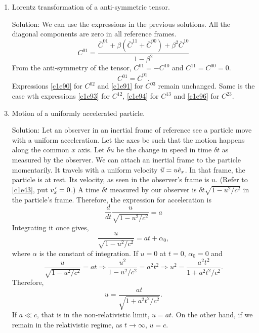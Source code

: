 \begin{enumerate}
\item Lorentz transformation of a anti-symmetric tensor. 
\item[Solution:] We can use the expressions in the previous solutions. All the
diagonal components are zero in all reference frames. 
\[
C^{01} = \frac{\bar{C}^{01} + \beta(\bar{C}^{11} + \bar{C}^{00}) + \beta^2\bar{C}^{10}}{1 - \beta^2}
\]
From the anti-symmetry of the tensor, $C^{01} = -C^{10}$ and $C^{11} = C^{00} = 0$.
\begin{equation}\label{c1e98}
C^{01} = \bar{C}^{01}.
\end{equation}
Expressions \eqref{c1e90} for $C^{02}$ and \eqref{c1e91} for $C^{03}$ remain
unchanged. Same is the case wth expressions \eqref{c1e93} for $C^{12}$, 
\eqref{c1e94} for $C^{13}$ and \eqref{c1e96} for $C^{23}$.

\item Motion of a uniformly accelerated particle.
\item[Solution:] Let an observer in an inertial frame of reference see a particle 
move with a uniform acceleration. Let the axes be such that the motion happens along
the common $x$ axis. Let $\delta u$ be the change in speed in time $\delta t$ as 
measured by the observer. We can attach an inertial frame to the particle momentarily. 
It travels with a uniform velocity $\vec{u} = u\hat{e}_{x}$. In that frame, the particle 
is at rest. Its velocity, as seen in the observer's frame is $u$. (Refer to 
\eqref{c1e43}, put $v_x^{\,\prime} = 0$.) A time $\delta t$ measured by our observer is 
$\delta t\sqrt{1 - u^2/c^2}$ in the particle's frame. Therefore, the expression for 
acceleration is
\begin{equation}\label{c1e99}
\frac{d}{dt}\frac{u}{\sqrt{1 - u^2/c^2}} = a
\end{equation}
Integrating it once gives,
\begin{equation}\label{c1e100}
\frac{u}{\sqrt{1 - u^2/c^2}} = at + \alpha_0,
\end{equation}
where $\alpha$ is the constant of integration. If $u = 0$ at $t = 0$, $\alpha_0 = 0$
and
\[
\frac{u}{\sqrt{1 - u^2/c^2}} = at \Rightarrow \frac{u^2}{1 - u^2/c^2} = a^2t^2
\Rightarrow u^2 = \frac{a^2t^2}{1 + a^2t^2/c^2}.
\]
Therefore,
\begin{equation}\label{c1e101}
u = \frac{at}{\sqrt{1 + a^2t^2/c^2}}.
\end{equation}
If $a \ll c$, that is in the non-relativistic limit, $u = at$. On the other hand,
if we remain in the relativistic regime, as $t \rightarrow \infty$, $u = c$.


\end{enumerate}

